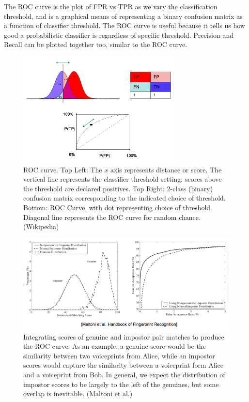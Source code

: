 \documentclass[a4paper]{article}
\begin{document}
The ROC curve is the plot of FPR vs TPR as we vary the classification threshold, and is a graphical means of representing a binary confusion matrix as a function of classifier threshold. The ROC curve is useful because it tells us how good a probabilistic classifier is regardless of specific threshold. Precision and Recall can be plotted together too, similar to the ROC curve.

\begin{figure}
\centering
\includegraphics[width=0.75\textwidth]{WikipediaROC.png}
\caption{\label{wikipedia_roc}ROC curve. Top Left: The $x$ axis represents distance or score.  The vertical line represents the classifier threshold setting: scores above the threshold are declared positives. Top Right: 2-class (binary) confusion matrix corresponding to the indicated choice of threshold. Bottom: ROC Curve, with dot representing choice of threshold. Diagonal line represents the ROC curve for random chance.  (Wikipedia)}
\end{figure}

\begin{figure}
\centering
\includegraphics[width=1.0\textwidth]{MaltoniROC.png}
\caption{\label{maltoni_roc}Integrating scores of genuine and impostor pair matches to produce the ROC curve.  As an example, a genuine score would be the similarity between two voiceprints from Alice, while an impostor scores would capture the similarity between a voiceprint form Alice and a voiceprint from Bob.  In general, we expect the distribution of impostor scores to be largely to the left of the genuines, but some overlap is inevitable. (Maltoni et al.)}
\end{figure}
\end{document}
